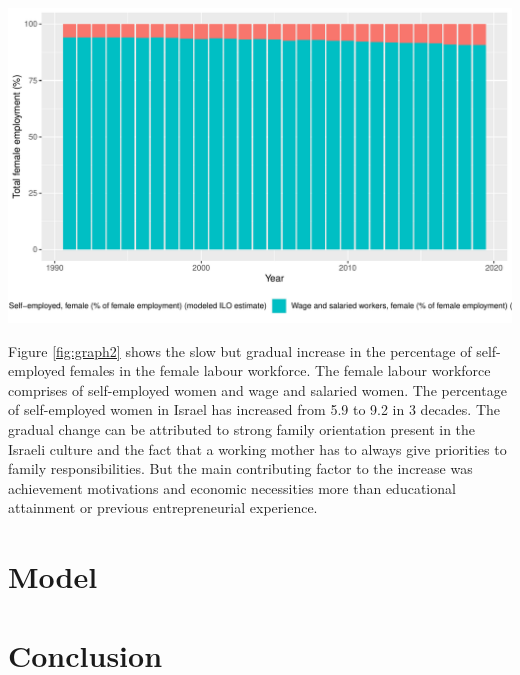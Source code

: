 \documentclass[11pt,a4paper,]{article}
\newenvironment{Shaded}{\begin{snugshade}}{\end{snugshade}}
\newcommand{\DataTypeTok}[1]{\textcolor[rgb]{0.13,0.29,0.53}{#1}}
\newcommand{\DecValTok}[1]{\textcolor[rgb]{0.00,0.00,0.81}{#1}}
\newcommand{\KeywordTok}[1]{\textcolor[rgb]{0.13,0.29,0.53}{\textbf{#1}}}
\newcommand{\NormalTok}[1]{#1}
\newcommand{\OperatorTok}[1]{\textcolor[rgb]{0.81,0.36,0.00}{\textbf{#1}}}
\newcommand{\StringTok}[1]{\textcolor[rgb]{0.31,0.60,0.02}{#1}}
\let\origfigure\figure
\let\endorigfigure\endfigure
\renewenvironment{figure}[1][2] {
    \expandafter\origfigure\expandafter[H]
} {
    \endorigfigure
}%
\begin{document}
\begin{Shaded}
\end{Shaded}

\begin{figure}
\centering
\includegraphics{report_files/figure-latex/graph2-1.pdf}
\caption{\label{fig:graph2}Self-employed v/s Wage \& salaried female workers}
\end{figure}

Figure \ref{fig:graph2} shows the slow but gradual increase in the percentage of self-employed females in the female labour workforce. The female labour workforce comprises of self-employed women and wage and salaried women. The percentage of self-employed women in Israel has increased from 5.9 to 9.2 in 3 decades. The gradual change can be attributed to strong family orientation present in the Israeli culture and the fact that a working mother has to always give priorities to family responsibilities. But the main contributing factor to the increase was achievement motivations and economic necessities more than educational attainment or previous entrepreneurial experience.

\section*{Model}

\section*{Conclusion}

\printbibliography
\end{document}
